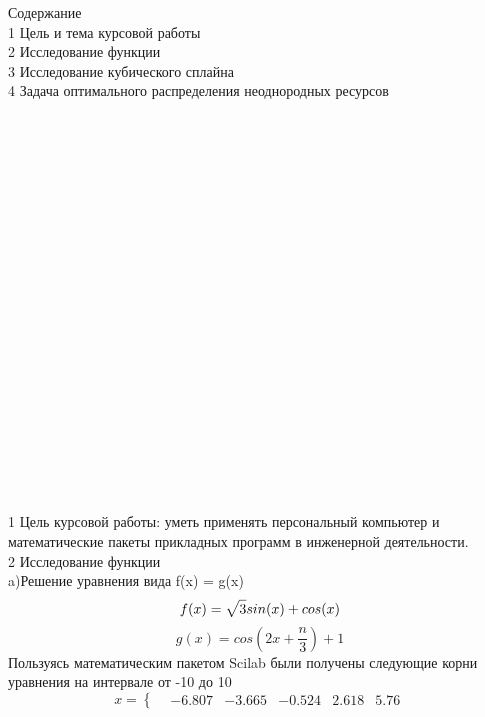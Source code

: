 \documentclass[russian,utf8,nocolumnxxxi,nocolumnxxxii]{eskdtext}
\begin{document}
\maketitle
Содержание\\

1 Цель и тема курсовой работы\\

2 Исследование функции\\

3 Исследование кубического сплайна\\

4 Задача оптимального распределения неоднородных ресурсов\\
\\
\\
\\
\\
\\
\\
\\
\\
\\
\\
\\
\\
\\
\\
\\
\\
\\
\\
\\
\\
\\
1 Цель курсовой работы: уметь применять персональный компьютер и
математические пакеты прикладных программ в инженерной деятельности.\\
2 Исследование функции\\
a)Решение уравнения вида f(x) = g(x)\\
\begin{equation}
f(x)= \sqrt{3\mathstrut}sin(x) + cos(x)
\end{equation}
\begin{equation}
g(x)=cos\left(2x+\frac n{3} \right)+1
\end{equation}
Пользуясь математическим пакетом Scilab были получены следующие корни уравнения на интервале от -10 до 10\\
\begin{equation}
x=\left\{
\begin{array}{c}

    &-6.807
    &-3.665
    &-0.524
    &2.618
    &5.76

    \end{array}
\right.
\end{equation}
\end{document}
